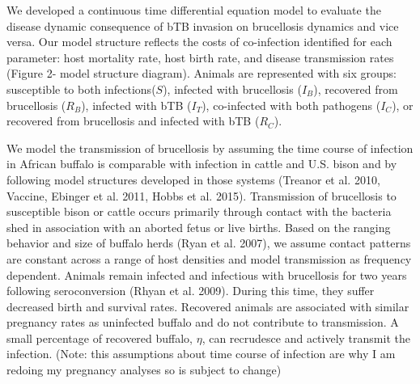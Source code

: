\documentclass[letterpaper,12pt]{article}
\begin{document}
\indent
	We developed a continuous time differential equation model to evaluate the disease dynamic consequence of bTB invasion on brucellosis dynamics and vice versa.  
Our model structure reflects the costs of co-infection identified for each parameter: host mortality rate, host birth rate, and disease transmission rates (Figure 2- model structure diagram).
Animals are represented with six groups: susceptible to both infections($S$), infected with brucellosis ($I_B$), recovered from brucellosis ($R_B$), infected with bTB ($I_T$), co-infected with both pathogens ($I_C$), or recovered from brucellosis and infected with bTB ($R_C$).

We model the transmission of brucellosis by assuming the time course of infection in African buffalo is comparable with infection in cattle and U.S. bison and by following model structures developed in those systems (Treanor et al. 2010, Vaccine, Ebinger et al. 2011, Hobbs et al. 2015).  
Transmission of brucellosis to susceptible bison or cattle occurs primarily through contact with the bacteria shed in association with an aborted fetus or live births.  
Based on the ranging behavior and size of buffalo herds (Ryan et al. 2007), we assume contact patterns are constant across a range of host densities and model transmission as frequency dependent.
Animals remain infected and infectious with brucellosis for two years following seroconversion (Rhyan et al. 2009).  
During this time, they suffer decreased birth and survival rates. 
Recovered animals are associated with similar pregnancy rates as uninfected buffalo and do not contribute to transmission. %
A small percentage of recovered buffalo, $\eta$, can recrudesce and actively transmit the infection. (Note: this assumptions about time course of infection are why I am redoing my pregnancy analyses so is subject to change) \\
\end{document}
